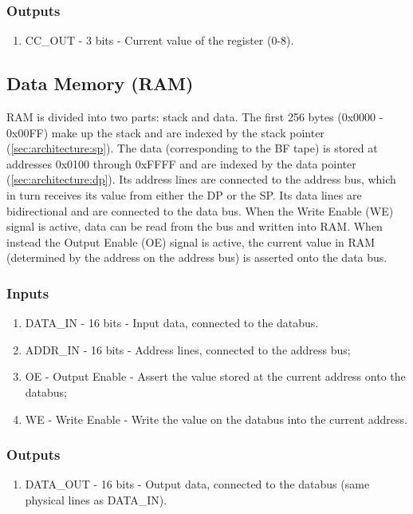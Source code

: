 \subsubsection*{Outputs}
\begin{enumerate}
\itemsep0em
\item CC\_OUT - 3 bits - Current value of the register (0-8).
\end{enumerate}

\subsection{Data Memory (RAM)}  \label{sec:architecture:ram}
RAM is divided into two parts: stack and data. The first 256 bytes (0x0000 - 0x00FF) make up the stack and are indexed by the stack pointer (\ref{sec:architecture:sp}). The data (corresponding to the BF tape) is stored at addresses 0x0100 through 0xFFFF and are indexed by the data pointer (\ref{sec:architecture:dp}). Its address lines are connected to the address bus, which in turn receives its value from either the DP or the SP. Its data lines are bidirectional and are connected to the data bus. When the Write Enable (WE) signal is active, data can be read from the bus and written into RAM. When instead the Output Enable (OE) signal is active, the current value in RAM (determined by the address on the address bus) is asserted onto the data bus.

\subsubsection*{Inputs}
\begin{enumerate}
\itemsep0em 
\item DATA\_IN - 16 bits - Input data, connected to the databus.
\item ADDR\_IN - 16 bits - Address lines, connected to the address bus;
\item OE - Output Enable - Assert the value stored at the current address onto the databus;
\item WE - Write Enable - Write the value on the databus into the current address.
\end{enumerate}

\subsubsection*{Outputs}
\begin{enumerate}
\itemsep0em 
\item DATA\_OUT - 16 bits - Output data, connected to the databus (same physical lines as DATA\_IN).
\end{enumerate}

